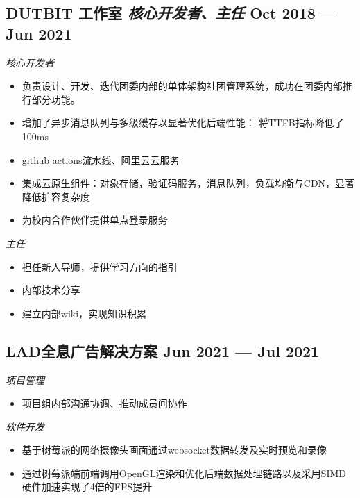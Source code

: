 \documentclass[a4,12pt]{article}
\newcommand{\subtext}[1]{
#1\par\vspace{-0.3cm}}
\newenvironment{zitemize}{
\begin{itemize}\itemsep0pt \parskip0pt \parsep1pt}
{\end{itemize}\vspace{-0.5cm}}
\begin{document}


\subsection*{DUTBIT 工作室 {\normalsize\normalfont \textit{核心开发者、主任}} \hfill  Oct 2018 --- Jun 2021} 
\subtext{\textit{核心开发者}}
    \begin{zitemize}
        \item 负责设计、开发、迭代团委内部的单体架构社团管理系统，成功在团委内部推行部分功能。
        \item 增加了异步消息队列与多级缓存以显著优化后端性能： 将TTFB指标降低了100ms
        \item github actions流水线、阿里云云服务
        \item 集成云原生组件：对象存储，验证码服务，消息队列，负载均衡与CDN，显著降低扩容复杂度
        \item 为校内合作伙伴提供单点登录服务 
    \end{zitemize}
\vspace{0.3cm}
\subtext{\textit{主任}}
\begin{zitemize}
    \item 担任新人导师，提供学习方向的指引
    \item 内部技术分享
    \item 建立内部wiki，实现知识积累
\end{zitemize}

\subsection*{LAD全息广告解决方案 \hfill \textbf{Jun 2021 --- Jul 2021}}
\subtext{\textit{项目管理}}
\begin{zitemize}
    \item 项目组内部沟通协调、推动成员间协作
\end{zitemize}

\vspace{0.3cm}
\subtext{\textit{软件开发}}
\begin{zitemize}
    \item 基于树莓派的网络摄像头画面通过websocket数据转发及实时预览和录像
    \item 通过树莓派端前端调用OpenGL渲染和优化后端数据处理链路以及采用SIMD硬件加速实现了4倍的FPS提升
    
\end{zitemize}
\end{document}
